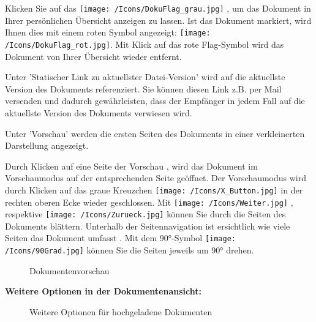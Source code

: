 Klicken Sie auf das \texttt{[image: /Icons/DokuFlag\_grau.jpg]} , um das Dokument in Ihrer persönlichen Übersicht anzeigen zu lassen. Ist das Dokument markiert, wird Ihnen dies mit einem roten Symbol angezeigt: \texttt{[image: /Icons/DokuFlag\_rot.jpg]}. Mit Klick auf das rote Flag-Symbol wird das Dokument von Ihrer Übersicht wieder entfernt. \newline

Unter 'Statischer Link zu aktuellster Datei-Version'  wird auf die aktuellste Version des Dokuments referenziert. Sie können diesen Link z.B. per Mail versenden und dadurch gewährleisten, dass der Empfänger in jedem Fall auf die aktuellste Version des Dokuments verwiesen wird.

Unter 'Vorschau'  werden die ersten Seiten des Dokuments in einer verkleinerten Darstellung angezeigt.

\vspace{\baselineskip}

Durch Klicken auf eine Seite der Vorschau , wird das Dokument im Vorschaumodus auf der entsprechenden Seite geöffnet. Der Vorschaumodus wird durch Klicken auf das graue Kreuzchen \texttt{[image: /Icons/X\_Button.jpg]}  in der rechten oberen Ecke wieder geschlossen. Mit \texttt{[image: /Icons/Weiter.jpg]} , respektive \texttt{[image: /Icons/Zurueck.jpg]}  können Sie durch die Seiten des Dokuments blättern. Unterhalb der Seitennavigation ist ersichtlich wie viele Seiten das Dokument umfasst . Mit dem 90°-Symbol \texttt{[image: /Icons/90Grad.jpg]}  können Sie die Seiten jeweils um 90° drehen.

\begin{figure}[H]
\caption{Dokumentenvorschau}
\end{figure}

\textbf{Weitere Optionen in der Dokumentenansicht:}

\begin{figure}[H]
\caption{Weitere Optionen für hochgeladene Dokumenten}
\end{figure}

